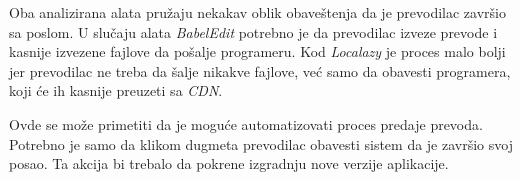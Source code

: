 Oba analizirana alata pružaju nekakav oblik obaveštenja da je prevodilac završio sa poslom. U slučaju alata \textit{BabelEdit}
potrebno je da prevodilac izveze prevode i kasnije izvezene fajlove da pošalje programeru. Kod \textit{Localazy} 
je proces malo bolji jer prevodilac ne treba da šalje nikakve fajlove, već samo da obavesti programera, 
koji će ih kasnije preuzeti sa \textit{CDN}.

Ovde se može primetiti da je moguće automatizovati proces predaje prevoda. Potrebno je samo da klikom dugmeta
prevodilac obavesti sistem da je završio svoj posao. Ta akcija bi trebalo da pokrene izgradnju nove verzije aplikacije.